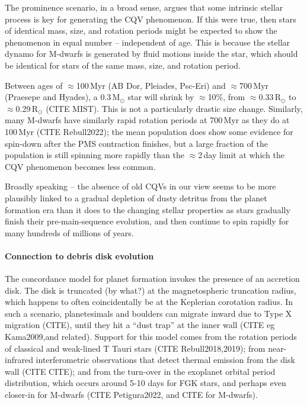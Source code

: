 \documentclass[11pt,twocolumn,tighten]{aastex63}
\begin{document}
The prominence scenario, in a broad sense, argues that some intrinsic
stellar process is key for generating the CQV phenomenon.
If this were true, then stars of identical mass, size, and rotation
periods might be expected to show the phenomenon in equal number --
independent of age.
This is because the stellar dynamo for M-dwarfs is generated by fluid
motions inside the star, which should be identical for stars of the
same mass, size, and rotation period.

Between ages of $\approx$100\,Myr (AB Dor, Pleiades, Psc-Eri) and
$\approx$700\,Myr (Praesepe and Hyades), a 0.3\,M$_\odot$ star will
shrink by $\approx$10\%, from $\approx$0.33\,R$_\odot$ to 
$\approx$0.29\,R$_\odot$ (CITE MIST).
This is not a particularly drastic size change.
Similarly, many M-dwarfs  have similarly rapid rotation periods 
at 700\,Myr as they do at 100\,Myr (CITE Rebull2022); 
the mean population does show some evidence for spin-down after the
PMS contraction finishes, but a large fraction of the population is
still spinning more rapidly than the $\approx$2\,day limit at which
the CQV phenomenon becomes less common.

Broadly speaking -- the absence of old CQVs in our view seems to be
more plausibly linked to a gradual depletion of dusty detritus from the
planet formation era than it does to the changing stellar properties
as stars gradually finish their pre-main-sequence evolution, and then
continue to spin rapidly for many hundreds of millions of years.



\paragraph{Connection to debris disk evolution}
The concordance model for planet formation invokes the presence of an accretion
disk.
The disk is truncated (by what?) at the magnetospheric truncation radius,
which happens to often coincidentally be at the Keplerian corotation radius.
In such a scenario, planetesimals and boulders can migrate inward due to
Type X migration (CITE),
until they hit a ``dust trap'' at the inner wall (CITE eg Kama2009,and
related).
Support for this model comes from the rotation periods of classical
and weak-lined T Tauri stars (CITE Rebull2018,2019);
from near-infrared interferometric observations that detect thermal
emission from the disk wall (CITE CITE);
and from the turn-over in the exoplanet orbital period distribution,
which occurs around 5-10 days for FGK stars, and perhaps even
closer-in for M-dwarfs (CITE Petigura2022, and CITE for M-dwarfs).
\end{document}
